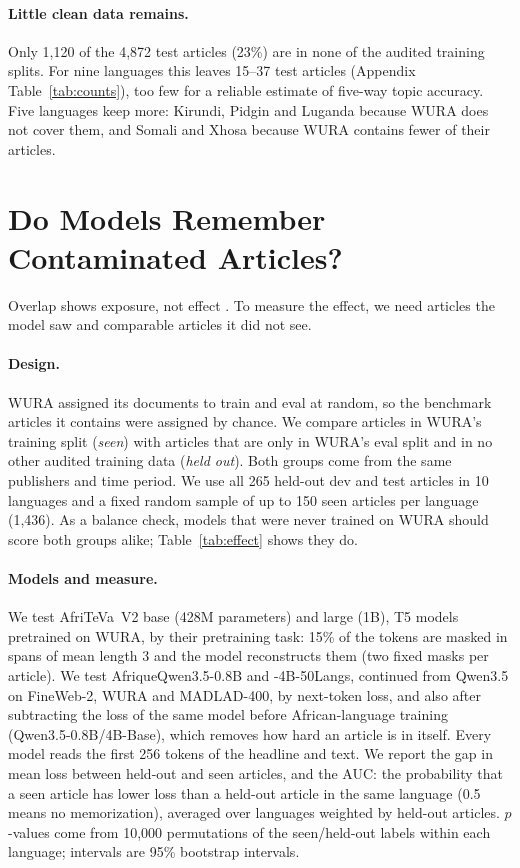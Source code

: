 \documentclass[11pt]{article}
\begin{document}
\paragraph{Little clean data remains.} Only 1,120 of the 4,872 test articles (23\%) are in none of the audited training splits. For nine languages this leaves 15--37 test articles (Appendix Table~\ref{tab:counts}), too few for a reliable estimate of five-way topic accuracy. Five languages keep more: Kirundi, Pidgin and Luganda because WURA does not cover them, and Somali and Xhosa because WURA contains fewer of their articles.

\section{Do Models Remember Contaminated Articles?}
\label{sec:effect}

Overlap shows exposure, not effect \citep{magar2022contamination}. To measure the effect, we need articles the model saw and comparable articles it did not see.

\paragraph{Design.} WURA assigned its documents to train and eval at random, so the benchmark articles it contains were assigned by chance. We compare articles in WURA's training split (\emph{seen}) with articles that are only in WURA's eval split and in no other audited training data (\emph{held out}). Both groups come from the same publishers and time period. We use all 265 held-out dev and test articles in 10 languages and a fixed random sample of up to 150 seen articles per language (1,436). As a balance check, models that were never trained on WURA should score both groups alike; Table~\ref{tab:effect} shows they do.

\paragraph{Models and measure.} We test AfriTeVa~V2 base (428M parameters) and large (1B), T5 models \citep{raffel2020t5} pretrained on WURA, by their pretraining task: 15\% of the tokens are masked in spans of mean length 3 and the model reconstructs them (two fixed masks per article). We test AfriqueQwen3.5-0.8B and -4B-50Langs, continued from Qwen3.5 \citep{qwen2026qwen35} on FineWeb-2, WURA and MADLAD-400, by next-token loss, and also after subtracting the loss of the same model before African-language training (Qwen3.5-0.8B/4B-Base), which removes how hard an article is in itself. Every model reads the first 256 tokens of the headline and text. We report the gap in mean loss between held-out and seen articles, and the AUC: the probability that a seen article has lower loss than a held-out article in the same language (0.5 means no memorization), averaged over languages weighted by held-out articles. $p$-values come from 10,000 permutations of the seen/held-out labels within each language; intervals are 95\% bootstrap intervals.
\end{document}
